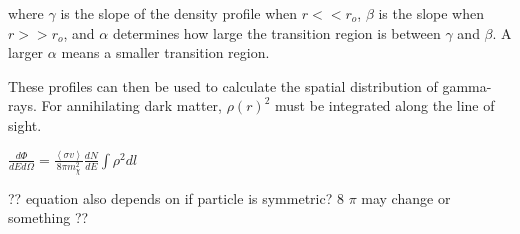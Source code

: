 where $\gamma$ is the slope of the density profile when $r << r_o$, $\beta$ is the slope when $r >> r_o$, and $\alpha$ determines how large the transition region is between $\gamma$ and $\beta$.
A larger $\alpha$ means a smaller transition region.

These profiles can then be used to calculate the spatial distribution of gamma-rays.
For annihilating dark matter, $\rho\left(r\right)^2$ must be integrated along the line of sight.

$ \frac{d\Phi}{dE d\Omega}= \frac{ \left \langle \sigma v \right \rangle }{8 \pi m_\chi^2} \frac{dN}{dE} \int \rho^2 dl $ \label{eqn:dmflux}

?? equation also depends on if particle is symmetric? 8 $\pi$ may change or something ??




%
%






